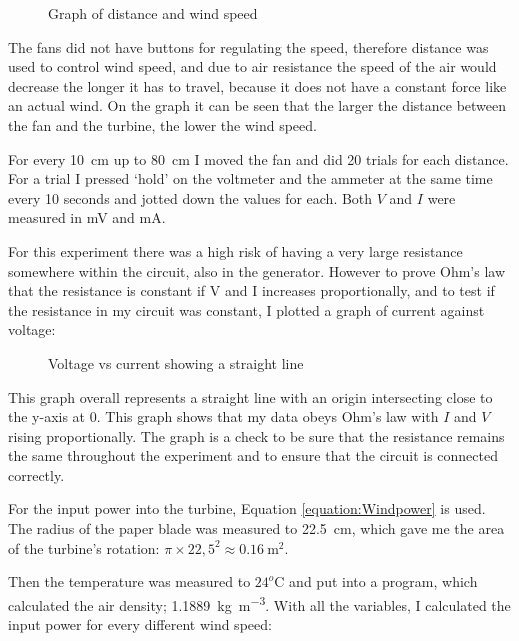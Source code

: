 \documentclass[12pt]{article}
\begin{document}
\begin{figure}
\centering
\caption{Graph of distance and wind speed}
\label{figure:DistanceVsWindSpeed}
\end{figure}

The fans did not have buttons for regulating the speed, therefore distance was used to control wind speed, and due to air resistance the speed of the air would decrease the longer it has to travel, because it does not have a constant force like an actual wind.
On the graph it can be seen that the larger the distance between the fan and the turbine, the lower the wind speed.

For every \SI{10}{\centi\metre} up to \SI{80}{\centi\metre} I moved the fan and did 20 trials for each distance.
For a trial I pressed `hold' on the voltmeter and the ammeter at the same time every 10 seconds and jotted down the values for each.
Both $V$ and $I$ were measured in \si{\milli\volt} and \si{\milli\ampere}.

For this experiment there was a high risk of having a very large resistance somewhere within the circuit, also in the generator.
However to prove Ohm's law that the resistance is constant if V and I increases proportionally, and to test if the resistance in my circuit was constant, I plotted a graph of current against voltage:

\begin{figure}
\centering
\caption{Voltage vs current showing a straight line}
\label{figure:OhmsLaw}
\end{figure}

This graph overall represents a straight line with an origin intersecting close to the y-axis at 0.
This graph shows that my data obeys Ohm's law with $I$ and $V$ rising proportionally.
The graph is a check to be sure that the resistance remains the same throughout the experiment and to ensure that the circuit is connected correctly.

For the input power into the turbine, Equation \ref{equation:Windpower} is used.
The radius of the paper blade was measured to \SI{22,5}{\centi\metre}, which gave me the area of the turbine's rotation: $\pi \times 22,5^2 \approx \SI{0,16}{\metre\squared}$.

Then the temperature was measured to $24^o$C and put into a program\cite{AirDensityCalculator}, which calculated the air density; \SI{1,1889}{\kilo\gram\per\metre\cubed}.
With all the variables, I calculated the input power for every different wind speed:
\end{document}
